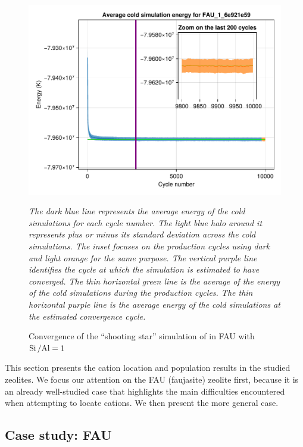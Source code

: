 \documentclass[main.tex]{subfiles}
\begin{document}
\begin{figure}
	{\centering
	\includegraphics[width=\columnwidth]{figures/cations/convergenceFAUshootingstar.pdf}
	\caption{Convergence of the ``shooting star'' simulation of  in FAU with $\mbox{Si\,/Al} = 1$\\}\label{fig:convergenceFAUshootingstar}

	\sl The dark blue line represents the average energy of the cold simulations for each cycle number. The light blue halo around it represents plus or minus its standard deviation across the cold simulations. The inset focuses on the production cycles using dark and light orange for the same purpose. The vertical purple line identifies the cycle at which the simulation is estimated to have converged. The thin horizontal green line is the average of the energy of the cold simulations during the production cycles. The thin horizontal purple line is the average energy of the cold simulations at the estimated convergence cycle.}
\end{figure}

This section presents the cation location and population results in the studied zeolites. We focus our attention on the FAU (faujasite) zeolite first, because it is an already well-studied case that highlights the main difficulties encountered when attempting to locate cations. We then present the more general case.

\subsection{Case study: FAU}
\end{document}
